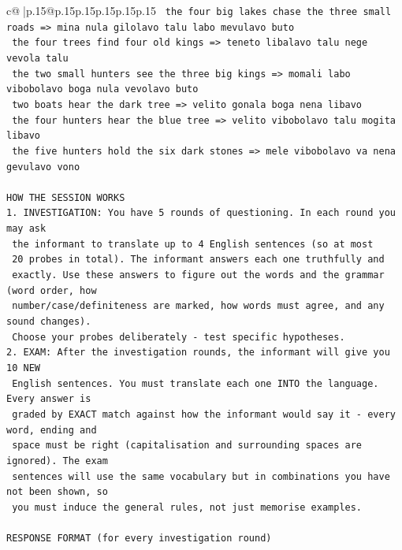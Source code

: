 \documentclass{article}
\begin{document}
{\begin{supertabular}{c@{$\;$}|p{.15\linewidth}@{}p{.15\linewidth}p{.15\linewidth}p{.15\linewidth}p{.15\linewidth}p{.15\linewidth}}
{{{\texttt{    the four big lakes chase the three small roads  =>  mina nula gilolavo talu labo mevulavo buto} \\
\texttt{    the four trees find four old kings  =>  teneto libalavo talu nege vevola talu} \\
\texttt{    the two small hunters see the three big kings  =>  momali labo vibobolavo boga nula vevolavo buto} \\
\texttt{    two boats hear the dark tree  =>  velito gonala boga nena libavo} \\
\texttt{    the four hunters hear the blue tree  =>  velito vibobolavo talu mogita libavo} \\
\texttt{    the five hunters hold the six dark stones  =>  mele vibobolavo va nena gevulavo vono} \\
\\ 
\texttt{HOW THE SESSION WORKS} \\
\texttt{1. INVESTIGATION: You have 5 rounds of questioning. In each round you may ask} \\
\texttt{   the informant to translate up to 4 English sentences (so at most} \\
\texttt{   20 probes in total). The informant answers each one truthfully and} \\
\texttt{   exactly. Use these answers to figure out the words and the grammar (word order, how} \\
\texttt{   number/case/definiteness are marked, how words must agree, and any sound changes).} \\
\texttt{   Choose your probes deliberately {-} test specific hypotheses.} \\
\texttt{2. EXAM: After the investigation rounds, the informant will give you 10 NEW} \\
\texttt{   English sentences. You must translate each one INTO the language. Every answer is} \\
\texttt{   graded by EXACT match against how the informant would say it {-} every word, ending and} \\
\texttt{   space must be right (capitalisation and surrounding spaces are ignored). The exam} \\
\texttt{   sentences will use the same vocabulary but in combinations you have not been shown, so} \\
\texttt{   you must induce the general rules, not just memorise examples.} \\
\\ 
\texttt{RESPONSE FORMAT (for every investigation round)} \\
}}}
\end{supertabular}}
\end{document}

